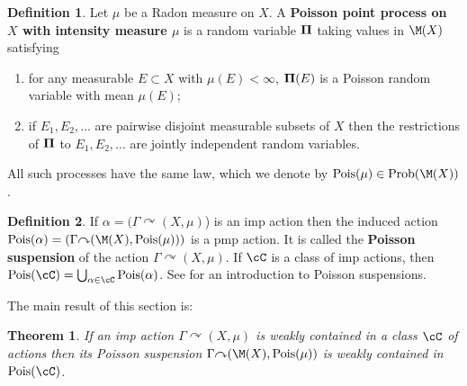 \documentclass[12pt]{article}
\theoremstyle{plain}
\newtheorem{thm}{Theorem}[section]
\theoremstyle{definition}
\newtheorem{defn}{Definition}
\theoremstyle{remark}
\newtheorem{remark}{Remark}
\newcommand{\G}{\Gamma}
\renewcommand\a{\alpha}
\newcommand\Pois{\operatorname{Pois}}
\newcommand\Prob{\operatorname{Prob}}
\def\cc{{\curvearrowright}}
\def\bfPi{{\mbox{\boldmath $\Pi$}}}
\begin{document}
\begin{defn}
Let  $\mu$ be a Radon measure on $X$. A {\bf Poisson point process on $X$ with intensity measure $\mu$} is a random variable $\bfPi$ taking values in $\M(X)$ satisfying
\begin{enumerate}
    \item for any measurable $E \subset X$ with $\mu(E)<\infty$,  $\bfPi(E)$ is a Poisson random variable with mean $\mu(E)$;
    \item if $E_1,E_2,\ldots$ are pairwise disjoint measurable subsets of $X$ then the restrictions of $\bfPi$ to $E_1,E_2,\ldots$ are jointly independent random variables.
\end{enumerate}
All such processes have the same law, which we denote by $\Pois(\mu) \in \Prob(\M(X))$.
\end{defn}

\begin{defn}
    If $\a=(\G \cc (X,\mu)$) is an imp action then the induced action $\Pois(\a)=(\G \cc (\M(X),\Pois(\mu)))$ is a pmp action. It is called the {\bf Poisson suspension} of the action $\G \cc (X,\mu)$. If $\cC$ is a class of imp actions, then $\Pois(\cC)=\bigcup_{\a\in\cC} \Pois(\a)$.
    See \cite{MR2486789} for an introduction to Poisson suspensions.
\end{defn}


The main result of this section is:
\begin{thm}\label{T:wc2}
If an imp action $\G \cc (X,\mu)$ is weakly contained in a class $\cC$ of actions then its Poisson suspension $\G \cc (\M(X),\Pois(\mu))$ is weakly contained in $\Pois(\cC)$.
\end{thm}




\end{document}
